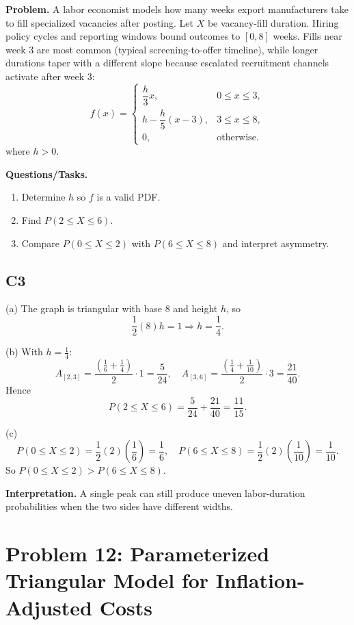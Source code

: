 \textbf{Problem.}
A labor economist models how many weeks export manufacturers take to fill specialized vacancies after posting. Let $X$ be vacancy-fill duration. Hiring policy cycles and reporting windows bound outcomes to $[0,8]$ weeks. Fills near week $3$ are most common (typical screening-to-offer timeline), while longer durations taper with a different slope because escalated recruitment channels activate after week $3$:
\[
f(x)=\begin{cases}
\dfrac{h}{3}x, & 0\le x\le 3,\\
h-\dfrac{h}{5}(x-3), & 3\le x\le 8,\\
0, & \text{otherwise.}
\end{cases}
\]
where $h>0$.

\textbf{Questions/Tasks.}
\begin{enumerate}[label=(\alph*)]
\item Determine $h$ so $f$ is a valid PDF.
\item Find $P(2\le X\le 6)$.
\item Compare $P(0\le X\le 2)$ with $P(6\le X\le 8)$ and interpret asymmetry.
\end{enumerate}

\subsection*{C3}
(a) The graph is triangular with base $8$ and height $h$, so
\[
\frac12(8)h=1\Rightarrow h=\frac14.
\]

(b) With $h=\frac14$:
\[
A_{[2,3]}=\frac{\left(\frac16+\frac14\right)}{2}\cdot1=\frac{5}{24},
\quad
A_{[3,6]}=\frac{\left(\frac14+\frac1{10}\right)}{2}\cdot3=\frac{21}{40}.
\]
Hence
\[
P(2\le X\le 6)=\frac{5}{24}+\frac{21}{40}=\frac{11}{15}.
\]

(c)
\[
P(0\le X\le 2)=\frac12(2)\left(\frac16\right)=\frac16,
\quad
P(6\le X\le 8)=\frac12(2)\left(\frac1{10}\right)=\frac1{10}.
\]
So $P(0\le X\le 2)>P(6\le X\le 8)$.

\textbf{Interpretation.}
A single peak can still produce uneven labor-duration probabilities when the two sides have different widths.

\section{Problem 12: Parameterized Triangular Model for Inflation-Adjusted Costs}

